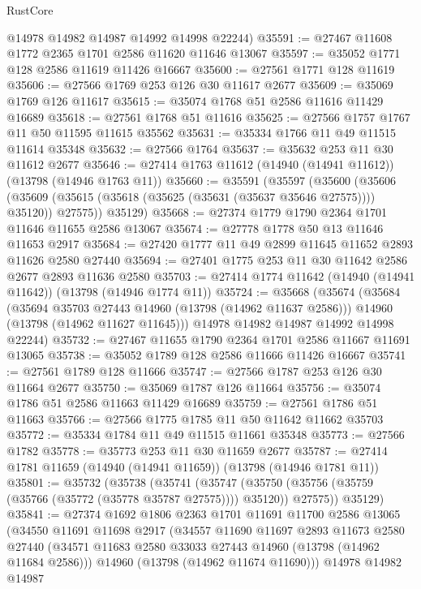 \begin{lexlean}{RustCore}
\begin{coremodule}
      @14978
      @14982
      @14987
      @14992
      @14998
      @22244)
@35591 := @27467 @11608 @1772 @2365 @1701 @2586 @11620 @11646 @13067
@35597 := @35052 @1771 @128 @2586 @11619 @11426 @16667
@35600 := @27561 @1771 @128 @11619
@35606 := @27566 @1769 @253 @126 @30 @11617 @2677
@35609 := @35069 @1769 @126 @11617
@35615 := @35074 @1768 @51 @2586 @11616 @11429 @16689
@35618 := @27561 @1768 @51 @11616
@35625 := @27566 @1757 @1767 @11 @50 @11595 @11615 @35562
@35631 := @35334 @1766 @11 @49 @11515 @11614 @35348
@35632 := @27566 @1764
@35637 := @35632 @253 @11 @30 @11612 @2677
@35646 := @27414 @1763 @11612 (@14940 (@14941 @11612)) (@13798 (@14946 @1763 @11))
@35660 := @35591
    (@35597
      (@35600
        (@35606 (@35609 (@35615 (@35618 (@35625 (@35631 (@35637 @35646 @27575)))) @35120)) @27575))
      @35129)
@35668 := @27374 @1779 @1790 @2364 @1701 @11646 @11655 @2586 @13067
@35674 := @27778 @1778 @50 @13 @11646 @11653 @2917
@35684 := @27420 @1777 @11 @49 @2899 @11645 @11652 @2893 @11626 @2580 @27440
@35694 := @27401 @1775 @253 @11 @30 @11642 @2586 @2677 @2893 @11636 @2580
@35703 := @27414 @1774 @11642 (@14940 (@14941 @11642)) (@13798 (@14946 @1774 @11))
@35724 := @35668
    (@35674
      (@35684
        (@35694 @35703 @27443 @14960 (@13798 (@14962 @11637 @2586)))
        @14960
        (@13798 (@14962 @11627 @11645)))
      @14978
      @14982
      @14987
      @14992
      @14998
      @22244)
@35732 := @27467 @11655 @1790 @2364 @1701 @2586 @11667 @11691 @13065
@35738 := @35052 @1789 @128 @2586 @11666 @11426 @16667
@35741 := @27561 @1789 @128 @11666
@35747 := @27566 @1787 @253 @126 @30 @11664 @2677
@35750 := @35069 @1787 @126 @11664
@35756 := @35074 @1786 @51 @2586 @11663 @11429 @16689
@35759 := @27561 @1786 @51 @11663
@35766 := @27566 @1775 @1785 @11 @50 @11642 @11662 @35703
@35772 := @35334 @1784 @11 @49 @11515 @11661 @35348
@35773 := @27566 @1782
@35778 := @35773 @253 @11 @30 @11659 @2677
@35787 := @27414 @1781 @11659 (@14940 (@14941 @11659)) (@13798 (@14946 @1781 @11))
@35801 := @35732
    (@35738
      (@35741
        (@35747 (@35750 (@35756 (@35759 (@35766 (@35772 (@35778 @35787 @27575)))) @35120)) @27575))
      @35129)
@35841 := @27374
    @1692
    @1806
    @2363
    @1701
    @11691
    @11700
    @2586
    @13065
    (@34550
      @11691
      @11698
      @2917
      (@34557
        @11690
        @11697
        @2893
        @11673
        @2580
        @27440
        (@34571 @11683 @2580 @33033 @27443 @14960 (@13798 (@14962 @11684 @2586)))
        @14960
        (@13798 (@14962 @11674 @11690)))
      @14978
      @14982
      @14987

\end{coremodule}
\end{lexlean}
